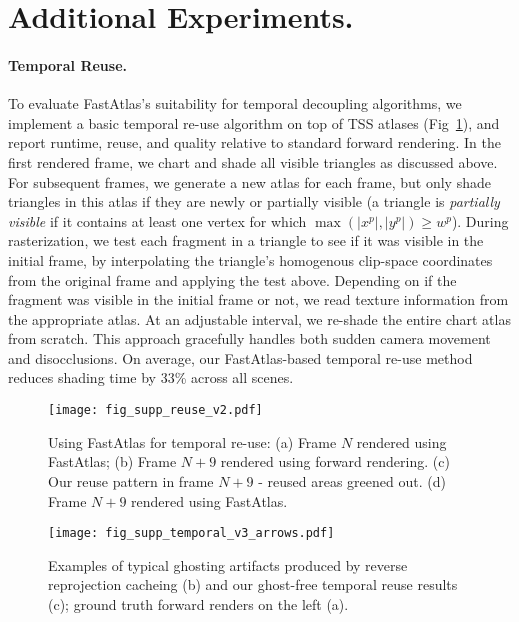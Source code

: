 \section{Additional Experiments.}

\paragraph*{Temporal Reuse.}
\label{sec:compare_temporal}
\label{sec:temporal}
\label{sec:reuse}

To evaluate FastAtlas's suitability for temporal decoupling algorithms, we implement a basic temporal re-use algorithm on top of TSS atlases (Fig~\ref{fig:temporal_compare}), and report runtime, reuse, and quality relative to standard forward rendering. 
In the first rendered frame, we chart and shade all visible triangles as discussed above. For subsequent frames, we generate a new atlas for each frame, but only shade triangles in this atlas if they are newly or partially visible (a triangle is \textit{partially visible} if it contains at least one vertex for which $\max(|x^p|, |y^p|) \geq w^p$). During rasterization, we test each fragment in a triangle to see if it was visible in the initial frame, by interpolating the triangle's homogenous clip-space coordinates from the original frame and applying the test above. Depending on if the fragment was visible in the initial frame or not, we read texture information from the appropriate atlas. At an adjustable interval, we re-shade the entire chart atlas from scratch. This approach gracefully handles both sudden camera movement and disocclusions.  On average, our FastAtlas-based temporal re-use method reduces shading time by 33\% across all scenes.

\begin{figure}
\texttt{[image: fig\_supp\_reuse\_v2.pdf]}
\caption{Using FastAtlas for temporal re-use: (a) Frame $N$ rendered using FastAtlas; (b) Frame $N+9$ rendered using forward rendering. (c) Our reuse pattern in frame $N+9$ - reused areas greened out. (d) Frame $N+9$ rendered using FastAtlas.}
\label{fig:temporal_compare}
\end{figure}

\begin{figure}
\texttt{[image: fig\_supp\_temporal\_v3\_arrows.pdf]}
\caption{Examples of typical ghosting artifacts produced by reverse reprojection cacheing \cite{nehab2007accelerating}(b) and our ghost-free temporal reuse results (c); ground truth forward renders on the left (a).}
\label{fig:ghosts}
\end{figure}

